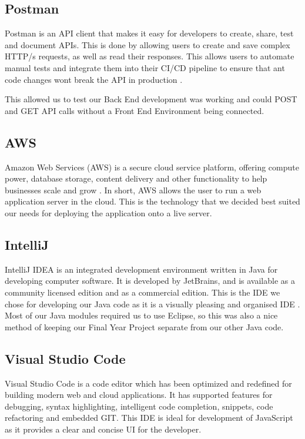 \subsection{Postman}
Postman is an API client that makes it easy for developers to create, share, test and document APIs. This is done by allowing users to create and save complex HTTP/s requests, as well as read their responses. This allows users to automate manual tests and integrate them into their CI/CD pipeline to ensure that ant code changes wont break the API in production \cite{PostMan}. \par
This allowed us to test our Back End development was working and could POST and GET API calls without a Front End Environment being connected.

\subsection{AWS}
Amazon Web Services (AWS) is a secure cloud service platform, offering compute power, database storage, content delivery and other functionality to help businesses scale and grow \cite{AWS}. In short, AWS allows the user to run a web application server in the cloud. This is the technology that we decided best suited our needs for deploying the application onto a live server.

\subsection{IntelliJ}
IntelliJ IDEA is an integrated development environment written in Java for developing computer software. It is developed by JetBrains, and is available as a community licensed edition and as a commercial edition. This is the IDE we chose for developing our Java code as it is a visually pleasing and organised IDE \cite{IntelliJ}. Most of our Java modules required us to use Eclipse, so this was also a nice method of keeping our Final Year Project separate from our other Java code.

\subsection{Visual Studio Code}
Visual Studio Code is a code editor which has been optimized and redefined for building modern web and cloud applications. It has supported features for debugging, syntax highlighting, intelligent code completion, snippets, code refactoring and embedded GIT.\cite{vscode} This IDE is ideal for development of JavaScript as it provides a clear and concise UI for the developer.

